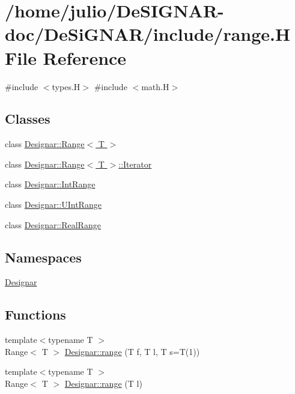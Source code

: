 \hypertarget{range_8_h}{}\section{/home/julio/\+De\+S\+I\+G\+N\+A\+R-\/doc/\+De\+Si\+G\+N\+A\+R/include/range.H File Reference}
\label{range_8_h}
{\ttfamily \#include $<$types.\+H$>$}\newline
{\ttfamily \#include $<$math.\+H$>$}\newline
\subsection*{Classes}
\begin{DoxyCompactItemize}
\item 
class \hyperlink{class_designar_1_1_range}{Designar\+::\+Range$<$ T $>$}
\item 
class \hyperlink{class_designar_1_1_range_1_1_iterator}{Designar\+::\+Range$<$ T $>$\+::\+Iterator}
\item 
class \hyperlink{class_designar_1_1_int_range}{Designar\+::\+Int\+Range}
\item 
class \hyperlink{class_designar_1_1_u_int_range}{Designar\+::\+U\+Int\+Range}
\item 
class \hyperlink{class_designar_1_1_real_range}{Designar\+::\+Real\+Range}
\end{DoxyCompactItemize}
\subsection*{Namespaces}
\begin{DoxyCompactItemize}
\item 
 \hyperlink{namespace_designar}{Designar}
\end{DoxyCompactItemize}
\subsection*{Functions}
\begin{DoxyCompactItemize}
\item 
{\footnotesize template$<$typename T $>$ }\\Range$<$ T $>$ \hyperlink{namespace_designar_aae435a76c71e126af37716ef5549d79d}{Designar\+::range} (T f, T l, T s=T(1))
\item 
{\footnotesize template$<$typename T $>$ }\\Range$<$ T $>$ \hyperlink{namespace_designar_a98dd2d05fccceaa32cdbf3f34c7dc120}{Designar\+::range} (T l)
\end{DoxyCompactItemize}
